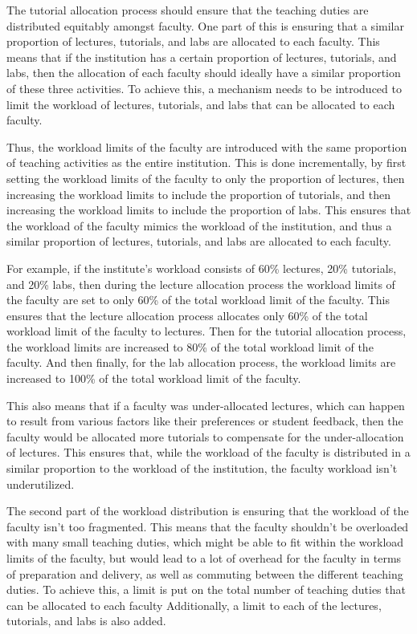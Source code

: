 The tutorial allocation process should ensure that the teaching duties are distributed equitably amongst faculty. One part of this is ensuring that a similar proportion of lectures, tutorials, and labs are allocated to each faculty. This means that if the institution has a certain proportion of lectures, tutorials, and labs, then the allocation of each faculty should ideally have a similar proportion of these three activities. To achieve this, a mechanism needs to be introduced to limit the workload of lectures, tutorials, and labs that can be allocated to each faculty.

Thus, the workload limits of the faculty are introduced with the same proportion of teaching activities as the entire institution. This is done incrementally, by first setting the workload limits of the faculty to only the proportion of lectures, then increasing the workload limits to include the proportion of tutorials, and then increasing the workload limits to include the proportion of labs. This ensures that the workload of the faculty mimics the workload of the institution, and thus a similar proportion of lectures, tutorials, and labs are allocated to each faculty.

For example, if the institute's workload consists of 60\% lectures, 20\% tutorials, and 20\% labs, then during the lecture allocation process the workload limits of the faculty are set to only 60\% of the total workload limit of the faculty. This ensures that the lecture allocation process allocates only 60\% of the total workload limit of the faculty to lectures. Then for the tutorial allocation process, the workload limits are increased to 80\% of the total workload limit of the faculty. And then finally, for the lab allocation process, the workload limits are increased to 100\% of the total workload limit of the faculty.

This also means that if a faculty was under-allocated lectures, which can happen to result from various factors like their preferences or student feedback, then the faculty would be allocated more tutorials to compensate for the under-allocation of lectures. This ensures that, while the workload of the faculty is distributed in a similar proportion to the workload of the institution, the faculty workload isn't underutilized.

The second part of the workload distribution is ensuring that the workload of the faculty isn't too fragmented. This means that the faculty shouldn't be overloaded with many small teaching duties, which might be able to fit within the workload limits of the faculty, but would lead to a lot of overhead for the faculty in terms of preparation and delivery, as well as commuting between the different teaching duties. To achieve this, a limit is put on the total number of teaching duties that can be allocated to each faculty Additionally, a limit to each of the lectures, tutorials, and labs is also added.


